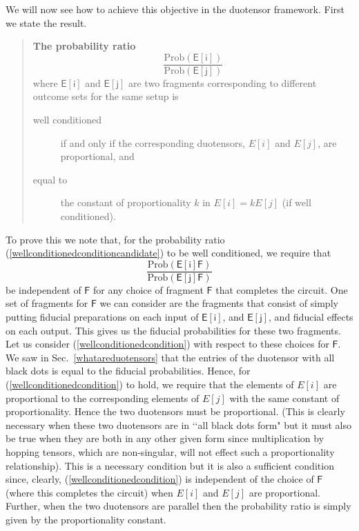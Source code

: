 \documentclass[10pt]{article}
\begin{document}
We will now see how to achieve this objective in the duotensor framework. First we state the result.
\begin{quote} {\bf The probability ratio}
\begin{equation}\label{wellconditionedconditioncandidate}
\frac{\text{Prob}(\mathsf{E[i]})}{\text{Prob}(\mathsf{E[j]})}
\end{equation}
where $\mathsf{E[i]}$ and $\mathsf{E[j]}$ are two fragments corresponding to different outcome sets for the same setup
is
\begin{description}
\item[well conditioned] if and only if the corresponding duotensors, $E[i]$ and $E[j]$, are proportional, and
\item[equal to] the constant of proportionality $k$ in $E[i]=k E[j]$ (if well conditioned).
\end{description}
\end{quote}
To prove this we note that, for the probability ratio (\ref{wellconditionedconditioncandidate}) to be well conditioned, we require that
\begin{equation}\label{wellconditionedcondition}
\frac{\text{Prob}(\mathsf{E[i]F})}{\text{Prob}(\mathsf{E[j]F})}
\end{equation}
be independent of $\mathsf F$ for any choice of fragment $\mathsf F$ that completes the circuit.  One set of fragments for $\mathsf F$ we can consider are the fragments that consist of simply putting fiducial preparations on each input of $\mathsf{ E[i]}$, and $\mathsf{ E[j]}$, and fiducial effects on each output.  This gives us the fiducial probabilities for these two fragments.   Let us consider
(\ref{wellconditionedcondition}) with respect to these choices for $\mathsf F$.  We saw in Sec.\ \ref{whatareduotensors} that the entries of the duotensor with all black dots is equal to the fiducial probabilities.  Hence, for (\ref{wellconditionedcondition}) to hold, we require that the elements of $ E[i]$ are proportional to the corresponding elements of $ E[j]$ with the same constant of proportionality.  Hence the two duotensors must be proportional.  (This is clearly necessary when these two duotensors are in \lq\lq all black dots form" but it must also be true when they are both in any other given form since multiplication by hopping tensors, which are non-singular, will not effect such a proportionality relationship).   This is a necessary condition but it is also a sufficient condition since, clearly, (\ref{wellconditionedcondition}) is independent of the choice of $\mathsf F$ (where this completes the circuit) when $E[i]$ and $E[j]$ are proportional.   Further, when the two duotensors are parallel then the probability ratio is simply given by the proportionality constant.
\end{document}
